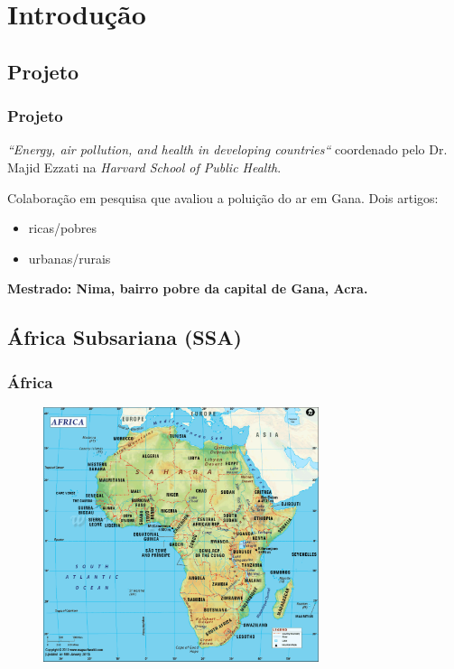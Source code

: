 \section{Introdução}

\subsection{Projeto}
\begin{frame}
  \frametitle{Projeto}
   \begin{tcolorbox}[colback=blue!5,colframe=blue!40!black,title=Projeto Internacional]
    \textit{``Energy, air pollution, and health in developing countries``}
             coordenado pelo Dr. Majid Ezzati na \textit{Harvard School of Public Health}.
   \end{tcolorbox}
   
   \begin{tcolorbox}[colback=blue!5,colframe=blue!40!black,title=Mestrado em Nima]
   	  Colaboração em pesquisa que avaliou a poluição do ar em Gana. Dois artigos:
   	  \begin{itemize}
   	  	\item ricas/pobres
   	  	\item urbanas/rurais
   	  \end{itemize}
   	 \begin{center}
   	 	\textbf{ Mestrado: Nima, bairro pobre da capital de Gana, Acra.   }
   	 \end{center} 
      \end{tcolorbox}
\end{frame}

\subsection{África Subsariana (SSA)}
\begin{frame}
  \frametitle{África}
  \begin{figure}[H]
    \includegraphics[width=0.72\textwidth]{../../inputs/images/africa-map.pdf}
  \end{figure}
\end{frame}

